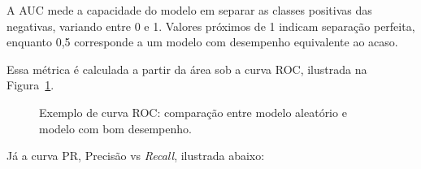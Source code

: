 A AUC mede a capacidade do modelo em separar as classes positivas das negativas, variando entre 0 e 1. Valores próximos de 1 indicam separação perfeita, enquanto 0,5 corresponde a um modelo com desempenho equivalente ao acaso. 

Essa métrica é calculada a partir da área sob a curva ROC, ilustrada na Figura~\ref{fig:roc}.


\begin{figure}[H]
    \centering
    \caption{Exemplo de curva ROC: comparação entre modelo aleatório e modelo com bom desempenho.}
    \label{fig:roc}
\end{figure}

Já a curva PR, Precisão vs \textit{Recall}, ilustrada abaixo:


\pgfplotsset{compat=1.18}

